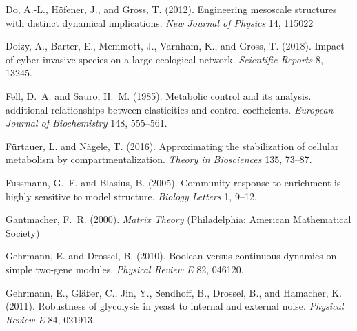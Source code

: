 \documentclass{article}
\begin{document}
\begin{thebibliography}{85}
Do, A.-L., H\"ofener, J., and Gross, T. (2012).
\newblock Engineering mesoscale structures with distinct dynamical
  implications.
\newblock \emph{New Journal of Physics} 14, 115022

Doizy, A., Barter, E., Memmott, J., Varnham, K., and Gross, T. (2018).
\newblock Impact of cyber-invasive species on a large ecological network.
\newblock \emph{Scientific Reports} 8, 13245.
\newblock {}

Fell, D.~A. and Sauro, H.~M. (1985).
\newblock Metabolic control and its analysis. additional relationships between
  elasticities and control coefficients.
\newblock \emph{European Journal of Biochemistry} 148, 555--561.
\newblock {}

F{\"u}rtauer, L. and N{\"a}gele, T. (2016).
\newblock Approximating the stabilization of cellular metabolism by
  compartmentalization.
\newblock \emph{Theory in Biosciences} 135, 73--87.
\newblock {}

Fussmann, G.~F. and Blasius, B. (2005).
\newblock Community response to enrichment is highly sensitive to model
  structure.
\newblock \emph{Biology Letters} 1, 9--12.
\newblock {}

Gantmacher, F.~R. (2000).
\newblock \emph{Matrix Theory} (Philadelphia: American Mathematical Society)

Gehrmann, E. and Drossel, B. (2010).
\newblock Boolean versus continuous dynamics on simple two-gene modules.
\newblock \emph{Physical Review E} 82, 046120.
\newblock {}

Gehrmann, E., Gl\"a\ss{}er, C., Jin, Y., Sendhoff, B., Drossel, B., and
  Hamacher, K. (2011).
\newblock Robustness of glycolysis in yeast to internal and external noise.
\newblock \emph{Physical Review E} 84, 021913.
\newblock {}


\end{thebibliography}
\end{document}
